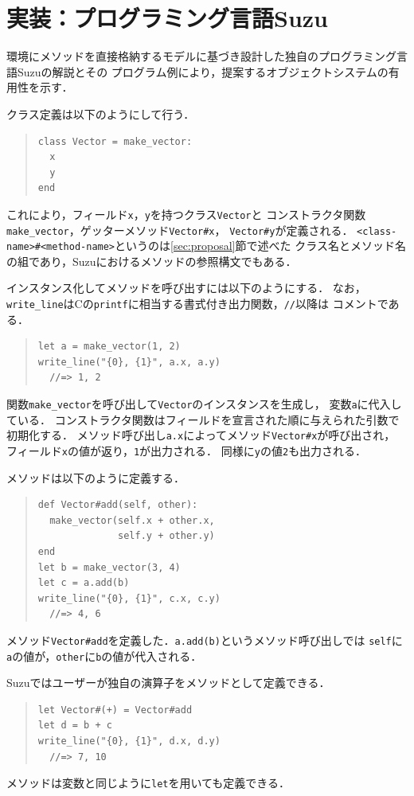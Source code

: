 \documentclass{ipsjprosym}
\begin{document}
\section{実装：プログラミング言語Suzu}
\label{sec:implementation}

環境にメソッドを直接格納するモデルに基づき設計した独自のプログラミング言語Suzuの解説とその
プログラム例により，提案するオブジェクトシステムの有用性を示す．

クラス定義は以下のようにして行う．
\begin{quote}
\begin{verbatim}
class Vector = make_vector:
  x
  y
end
\end{verbatim}
\end{quote}
これにより，フィールド\verb|x|，\verb|y|を持つクラス\verb|Vector|と
コンストラクタ関数\verb|make_vector|，ゲッターメソッド\verb|Vector#x|，
\verb|Vector#y|が定義される．
\verb|<class-name>#<method-name>|というのは\ref{sec:proposal}節で述べた
クラス名とメソッド名の組であり，Suzuにおけるメソッドの参照構文でもある．

インスタンス化してメソッドを呼び出すには以下のようにする．
なお，\verb|write_line|はCの\verb|printf|に相当する書式付き出力関数，\verb|//|以降は
コメントである．
\begin{quote}
\begin{verbatim}
let a = make_vector(1, 2)
write_line("{0}, {1}", a.x, a.y)
  //=> 1, 2
\end{verbatim}
\end{quote}
関数\verb|make_vector|を呼び出して\verb|Vector|のインスタンスを生成し，
変数\verb|a|に代入している．
コンストラクタ関数はフィールドを宣言された順に与えられた引数で初期化する．
メソッド呼び出し\verb|a.x|によってメソッド\verb|Vector#x|が呼び出され，
フィールド\verb|x|の値が返り，\verb|1|が出力される．
同様に\verb|y|の値\verb|2|も出力される．

メソッドは以下のように定義する．
\begin{quote}
\begin{verbatim}
def Vector#add(self, other):
  make_vector(self.x + other.x,
              self.y + other.y)
end
let b = make_vector(3, 4)
let c = a.add(b)
write_line("{0}, {1}", c.x, c.y)
  //=> 4, 6 
\end{verbatim}
\end{quote}
メソッド\verb|Vector#add|を定義した．\verb|a.add(b)|というメソッド呼び出しでは
\verb|self|に\verb|a|の値が，\verb|other|に\verb|b|の値が代入される．

Suzuではユーザーが独自の演算子をメソッドとして定義できる．
\begin{quote}
\begin{verbatim}
let Vector#(+) = Vector#add
let d = b + c
write_line("{0}, {1}", d.x, d.y)
  //=> 7, 10
\end{verbatim}
\end{quote}
メソッドは変数と同じように\verb|let|を用いても定義できる．
\end{document}
